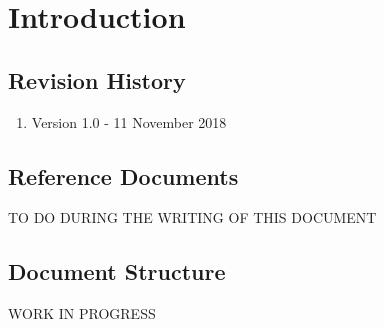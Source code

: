 \documentclass[../rasd.tex]{subfiles}
\begin{document}
\chapter{Introduction}
		
		
		
		
		
	
		\section{Revision History}
		\begin{enumerate}
			\item Version 1.0 - 11 November 2018
		\end{enumerate}
		\section{Reference Documents}
		TO DO DURING THE WRITING OF THIS DOCUMENT
		\section{Document Structure}
		WORK IN PROGRESS
		
\end{document}
